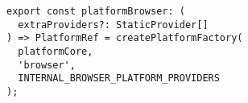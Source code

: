 \begin{verbatim}
export const platformBrowser: (
  extraProviders?: StaticProvider[]
) => PlatformRef = createPlatformFactory(
  platformCore,
  'browser',
  INTERNAL_BROWSER_PLATFORM_PROVIDERS
);
\end{verbatim}
